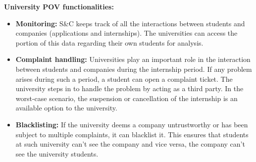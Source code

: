 \par\textbf{University POV functionalities:}


\begin{itemize}
        \item \textbf{Monitoring:} S\&C keeps track of all the interactions between students and companies (applications and internships). The universities can access the portion of this data regarding their own students for analysis.
        \item \textbf{Complaint handling:} Universities play an important role in the interaction between students and companies during the internship period. If any problem arises during such a period, a student can open a complaint ticket. The university steps in to handle the problem by acting as a third party. In the worst-case scenario, the suspension or cancellation of the internship is an available option to the university.
        \item \textbf{Blacklisting:} If the university deems a company untrustworthy or has been subject to multiple complaints, it can blacklist it. This ensures that students at such university can’t see the company and vice versa, the company can’t see the university students. 
\end{itemize}